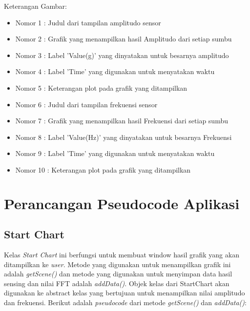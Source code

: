 Keterangan Gambar:
\begin{itemize}
    \item Nomor 1 : Judul dari tampilan amplitudo sensor
    \item Nomor 2 : Grafik yang menampilkan hasil Amplitudo dari setiap sumbu
    \item Nomor 3 : Label 'Value(g)' yang dinyatakan untuk besarnya amplitudo
    \item Nomor 4 : Label 'Time' yang digunakan untuk menyatakan waktu
    \item Nomor 5 : Keterangan plot pada grafik yang ditampilkan
    \item Nomor 6 : Judul dari tampilan frekuensi sensor
    \item Nomor 7 : Grafik yang menampilkan hasil Frekuensi dari setiap sumbu
    \item Nomor 8 : Label 'Value(Hz)' yang dinyatakan untuk besarnya Frekuensi
    \item Nomor 9 : Label 'Time' yang digunakan untuk menyatakan waktu
    \item Nomor 10 : Keterangan plot pada grafik yang ditampilkan
\end{itemize}

\section{Perancangan Pseudocode Aplikasi}
\subsection{Start Chart}
Kelas \textit{Start Chart} ini berfungsi untuk membuat window hasil grafik yang akan ditampilkan ke \textit{user}. Metode yang digunakan untuk menampilkan grafik ini adalah \textit{getScene()} dan metode yang digunakan untuk menyimpan data hasil sensing dan nilai FFT adalah \textit{addData()}. Objek kelas dari StartChart akan digunakan ke abstract kelas yang bertujuan untuk menampilkan nilai amplitudo dan frekuensi. Berikut adalah \textit{pseudocode} dari metode \textit{getScene()} dan \textit{addData()}:

